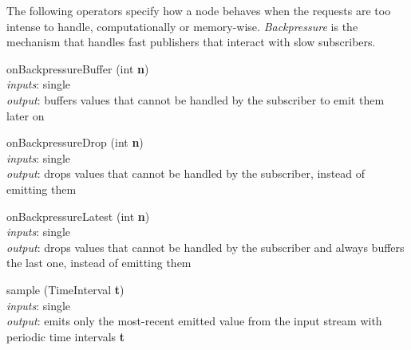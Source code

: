 \documentclass{dithesis}
\begin{document}
The following operators specify how a node behaves when the requests are too intense to handle, computationally or memory-wise. \textit{Backpressure} is the mechanism that handles fast publishers that interact with slow subscribers.
\begin{description}

\begin{minipage}[c]{0.4\linewidth}
\item[onBackpressureBuffer] (int \textbf{n})\\
	\textit{inputs}: single \\
	\textit{output}: buffers values that cannot be handled by the subscriber to emit them later on
\end{minipage}
\begin{minipage}[c]{0.6\linewidth}

\end{minipage}

\begin{minipage}[c]{0.4\linewidth}
\item[onBackpressureDrop] (int \textbf{n})\\
	\textit{inputs}: single \\
	\textit{output}: drops values that cannot be handled by the subscriber, instead of emitting them
\end{minipage}
\begin{minipage}[c]{0.6\linewidth}

\end{minipage}

\begin{minipage}[c]{0.4\linewidth}
\item[onBackpressureLatest] (int \textbf{n})\\
	\textit{inputs}: single \\
	\textit{output}: drops values that cannot be handled by the subscriber and always buffers the last one, instead of emitting them
\end{minipage}
\begin{minipage}[c]{0.6\linewidth}

\end{minipage}

\begin{minipage}[c]{0.4\linewidth}
\item[sample] (TimeInterval \textbf{t})\\
	\textit{inputs}: single \\
	\textit{output}: emits only the most-recent emitted value from the input stream with periodic time intervals \textbf{t}
\end{minipage}
\begin{minipage}[c]{0.6\linewidth}

\end{minipage}


\end{description}
\end{document}
